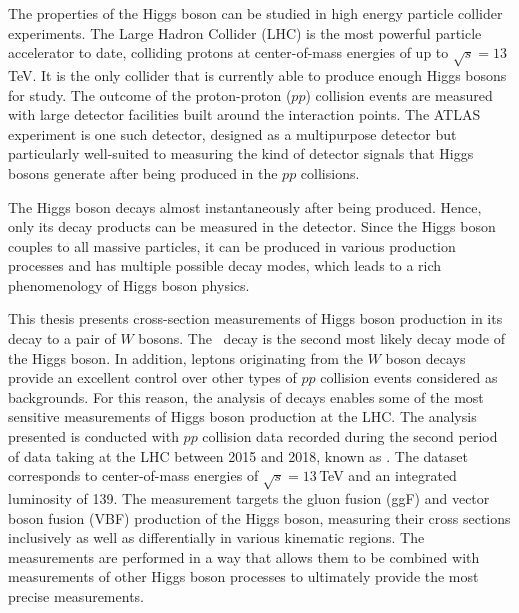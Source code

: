The properties of the Higgs boson can be studied in high energy particle collider experiments. 
The Large Hadron Collider (LHC) is the most powerful particle accelerator to date, colliding protons at center-of-mass energies of up to $\sqrt{s} = 13\,$TeV. It is the only collider that is currently able to produce enough Higgs bosons for study.
The outcome of the proton-proton ($pp$) collision events are measured with large detector facilities built around the interaction points. 
The ATLAS experiment is one such detector, designed as a multipurpose detector but particularly well-suited to measuring the kind of detector signals that Higgs bosons generate after being produced in the $pp$ collisions.

The Higgs boson decays almost instantaneously after being produced. Hence, only its decay products can be measured in the detector. Since the Higgs boson couples to all massive particles, it can be produced in various production processes and has multiple possible decay modes, which leads to a rich phenomenology of Higgs boson physics. 

This thesis presents cross-section measurements of Higgs boson production in its decay to a pair of $W$ bosons.
The \HWW\ decay is the second most likely decay mode of the Higgs boson. In addition, leptons originating from the $W$ boson decays provide an excellent control over other types of $pp$ collision events considered as backgrounds.
For this reason, the analysis of \HWWdet decays enables some of the most sensitive measurements of Higgs boson production at the LHC.
The \HWWdet analysis presented is conducted with $pp$ collision data recorded during the second period of data taking at the LHC between 2015 and 2018, known as \RunTwo. The dataset corresponds to center-of-mass energies of $\sqrt{s} = 13\,$TeV and an integrated luminosity of 139\ifb.
The measurement targets the gluon fusion (ggF) and vector boson fusion (VBF) production of the Higgs boson, measuring their cross sections inclusively as well as differentially in various kinematic regions.
The measurements are performed in a way that allows them to be combined with measurements of other Higgs boson processes to ultimately provide the most precise measurements.


